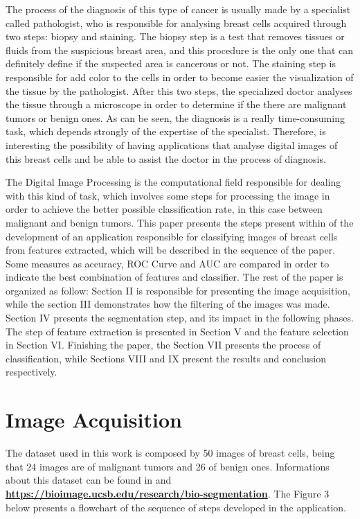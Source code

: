 \documentclass[conference]{IEEEtran}
\begin{document}
The process of the diagnosis of this type of cancer is usually made by a specialist called pathologist, who is responsible for analysing breast cells acquired through two steps: biopsy and staining. The biopsy step is a test that removes tissues or fluids from the suspicious breast area, and this procedure is the only one that can definitely define if the suspected area is cancerous or not. The staining step is responsible for add color to the cells in order to become easier the visualization of the tissue by the pathologist. After this two steps, the specialized doctor analyses the tissue through a microscope in order to determine if the there are malignant tumors or benign ones. As can be seen, the diagnosis is a really time-consuming task, which depends strongly of the expertise of the specialist. Therefore, is interesting the possibility of having applications that analyse digital images of this breast cells and be able to assist the doctor in the process of diagnosis. \par
The Digital Image Processing is the computational field responsible for dealing with this kind of task, which involves some steps for processing the image in order to achieve the better possible classification rate, in this case between malignant and benign tumors. This paper presents the steps present within of the development of an application responsible for classifying images of breast cells from features extracted, which will be described in the sequence of the paper. Some measures as accuracy, ROC Curve and AUC are compared in order to indicate the best combination of features and classifier. The rest of the paper is organized as follow:  Section II is responsible for presenting the image acquisition, while the section III demonstrates how the filtering of the images was made. Section IV presents the segmentation step, and its impact in the following phases. The step of feature extraction is presented in Section V and the feature selection in Section VI. Finishing the paper, the Section VII presents the process of classification, while Sections VIII and IX present the results and conclusion respectively.

\section{Image Acquisition}
The dataset used in this work is composed by 50 images of breast cells, being that 24 images are of malignant tumors and 26 of benign ones. Informations about this dataset can be found in \cite{artigo_database} and \href{https://bioimage.ucsb.edu/research/bio-segmentation}{\textbf{https://bioimage.ucsb.edu/research/bio-segmentation}}. The Figure 3 below presents a flowchart of the sequence of steps developed in the application.
\end{document}
